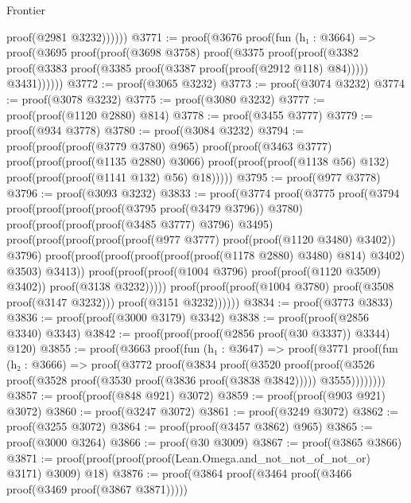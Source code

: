 \begin{lexlean}{Frontier}
\begin{coremodule}
                      proof(@2981 @3232))))))
@3771 := proof(@3676
      proof(fun (h₁ : @3664) =>
        proof(@3695
            proof(proof(@3698 @3758)
                proof(@3375
                    proof(proof(@3382
                          proof(@3383 proof(@3385 proof(@3387 proof(proof(@2912 @118) @84)))))
                        @3431))))))
@3772 := proof(@3065 @3232)
@3773 := proof(@3074 @3232)
@3774 := proof(@3078 @3232)
@3775 := proof(@3080 @3232)
@3777 := proof(proof(@1120 @2880) @814)
@3778 := proof(@3455 @3777)
@3779 := proof(@934 @3778)
@3780 := proof(@3084 @3232)
@3794 := proof(proof(proof(@3779 @3780) @965)
      proof(proof(@3463 @3777)
          proof(proof(proof(@1135 @2880) @3066)
              proof(proof(proof(@1138 @56) @132) proof(proof(proof(@1141 @132) @56) @18)))))
@3795 := proof(@977 @3778)
@3796 := proof(@3093 @3232)
@3833 := proof(@3774
      proof(@3775
          proof(@3794
              proof(proof(proof(proof(@3795 proof(@3479 @3796)) @3780)
                    proof(proof(proof(proof(@3485 @3777) @3796) @3495)
                        proof(proof(proof(proof(proof(@977 @3777) proof(proof(@1120 @3480) @3402))
                                @3796)
                              proof(proof(proof(proof(proof(proof(@1178 @2880) @3480) @814) @3402)
                                    @3503)
                                  @3413))
                            proof(proof(proof(@1004 @3796) proof(proof(@1120 @3509) @3402))
                                proof(@3138 @3232)))))
                  proof(proof(proof(@1004 @3780) proof(@3508 proof(@3147 @3232)))
                      proof(@3151 @3232))))))
@3834 := proof(@3773 @3833)
@3836 := proof(proof(@3000 @3179) @3342)
@3838 := proof(proof(@2856 @3340) @3343)
@3842 := proof(proof(proof(@2856 proof(@30 @3337)) @3344) @120)
@3855 := proof(@3663
      proof(fun (h₁ : @3647) =>
        proof(@3771
            proof(fun (h₂ : @3666) =>
              proof(@3772
                  proof(@3834
                      proof(@3520
                          proof(proof(@3526
                                proof(@3528 proof(@3530 proof(@3836 proof(@3838 @3842)))))
                              @3555))))))))
@3857 := proof(proof(@848 @921) @3072)
@3859 := proof(proof(@903 @921) @3072)
@3860 := proof(@3247 @3072)
@3861 := proof(@3249 @3072)
@3862 := proof(@3255 @3072)
@3864 := proof(proof(@3457 @3862) @965)
@3865 := proof(@3000 @3264)
@3866 := proof(@30 @3009)
@3867 := proof(@3865 @3866)
@3871 := proof(proof(proof(proof(Lean.Omega.and_not_not_of_not_or) @3171) @3009) @18)
@3876 := proof(@3864 proof(@3464 proof(@3466 proof(@3469 proof(@3867 @3871)))))

\end{coremodule}
\end{lexlean}
